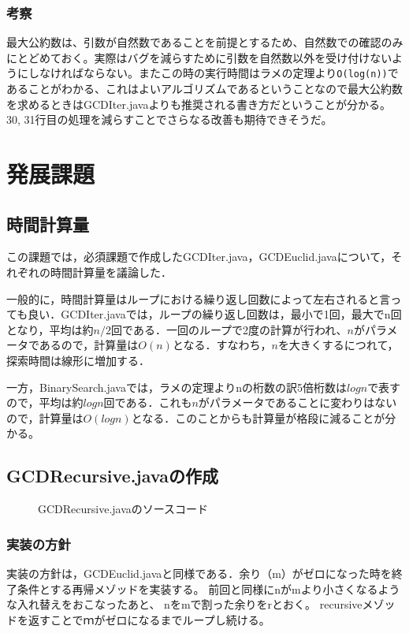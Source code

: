 \documentclass[10.5pt,a4paper]{jsarticle}
\begin{document}
\subsubsection{考察}
最大公約数は、引数が自然数であることを前提とするため、自然数での確認のみにとどめておく。実際はバグを減らすために引数を自然数以外を受け付けないようにしなければならない。またこの時の実行時間はラメの定理より\texttt{O(log(n))}であることがわかる、これはよいアルゴリズムであるということなので最大公約数を求めるときはGCDIter.javaよりも推奨される書き方だということが分かる。30, 31行目の処理を減らすことでさらなる改善も期待できそうだ。

\section{発展課題}

\subsection{時間計算量}

この課題では，必須課題で作成したGCDIter.java，GCDEuclid.javaについて，それぞれの時間計算量を議論した．

一般的に，時間計算量はループにおける繰り返し回数によって左右されると言っても良い．GCDIter.javaでは，ループの繰り返し回数は，最小で1回，最大でn回となり，平均は約$n/2$回である．一回のループで2度の計算が行われ、$n$がパラメータであるので，計算量は$O(n)$となる．すなわち，$n$を大きくするにつれて，探索時間は線形に増加する．

一方，BinarySearch.javaでは，ラメの定理よりnの桁数の訳5倍桁数は$logn$で表すので，平均は約$logn$回である．これも$n$がパラメータであることに変わりはないので，計算量は$O(logn)$となる．このことからも計算量が格段に減ることが分かる。

\subsection{GCDRecursive.javaの作成}

\begin{figure}[t]
  \begin{center}
   
   \caption{GCDRecursive.javaのソースコード}
   \label{code:GCDRecursive}
  \end{center}
 \end{figure}

\subsubsection{実装の方針}\label{sec:bs_impl_policy}
実装の方針は，GCDEuclid.javaと同様である．余り（m）がゼロになった時を終了条件とする再帰メゾッドを実装する。
前回と同様にnがmより小さくなるような入れ替えをおこなったあと、
nをmで割った余りをrとおく。
recursiveメゾッドを返すことでｍがゼロになるまでループし続ける。
\end{document}
